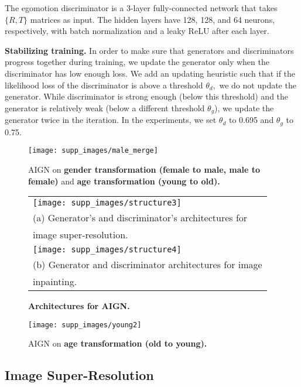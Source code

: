 \documentclass[10pt,twocolumn,letterpaper]{article}
\begin{document}
\begin{bibunit}[ieee]
\begin{appendices}
The egomotion discriminator is a 3-layer fully-connected network that takes $\{R,T\}$ matrices as input. The hidden layers have 128, 128, and 64 neurons, respectively, with batch normalization and a leaky ReLU after each layer.

\textbf{Stabilizing training.} 
In order to  make sure that generators and discriminators progress together during training, we update the generator  only when the discriminator has low enough loss. We add an updating heuristic such that if the likelihood loss of the discriminator is above a threshold $\theta_d,$ we do not update the generator. While discriminator is strong enough (below this threshold) and the generator is relatively weak (below a different threshold $\theta_g$), we update the generator twice %
in the iteration. 
In the experiments, we set $\theta_d$ to 0.695 and $\theta_g$ to 0.75.

\begin{figure*}[t]
    \centering
    \texttt{[image: supp\_images/male\_merge]}
     \centering
    \caption{AIGN on \textbf{gender transformation (female to male, male to female)} and \textbf{age transformation (young to old).}}
    \label{fig:more-male-merge}
\end{figure*}\begin{figure}[t]
    \begin{tabular}{l}
    \texttt{[image: supp\_images/structure3]} \\
    (a) Generator's and discriminator's architectures for  \\image super-resolution. \\
    \texttt{[image: supp\_images/structure4]} \\
    (b) Generator and discriminator architectures for image  \\inpainting. \\
    \end{tabular}
\centering
    \caption{\textbf{Architectures for AIGN.}}
    \label{fig:architectures}
\end{figure}\begin{figure}[t]
    \centering
    \texttt{[image: supp\_images/young2]}
     \centering
    \caption{AIGN on \textbf{age transformation (old to young).}}
    \label{fig:more-young}
\end{figure}\subsection{Image Super-Resolution}


\end{appendices}
\end{bibunit}
\end{document}
